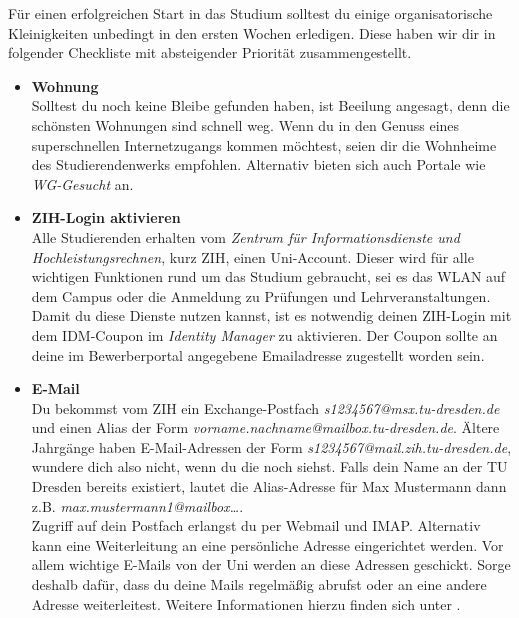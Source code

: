 \newcommand{\checkbox}[1]{\item[$\square$]\textbf{#1}\\}


Für einen erfolgreichen Start in das Studium solltest du einige organisatorische
Kleinigkeiten unbedingt in den ersten Wochen erledigen. Diese haben wir dir in
folgender Checkliste mit absteigender Priorität zusammengestellt.

\begin{itemize}[leftmargin=*]

\checkbox{Wohnung}
Solltest du noch keine Bleibe gefunden haben, ist Beeilung angesagt, denn die
schönsten Wohnungen sind schnell weg. Wenn du in den Genuss eines
superschnellen Internetzugangs kommen möchtest, seien dir die Wohnheime
 des
Studierendenwerks empfohlen. Alternativ bieten sich auch Portale wie
\textit{WG-Gesucht}  an.

\checkbox{ZIH-Login aktivieren}
Alle Studierenden erhalten vom \textit{Zentrum für Informationsdienste und
Hochleistungsrechnen}, kurz ZIH, einen Uni-Account. Dieser wird für alle
wichtigen Funktionen rund um das Studium gebraucht, sei es das WLAN auf dem
Campus oder die Anmeldung zu Prüfungen und Lehrveranstaltungen. \\
Damit du diese Dienste nutzen kannst, ist es notwendig deinen ZIH-Login mit dem
IDM-Coupon im \textit{Identity Manager} 
zu aktivieren. Der Coupon sollte an deine im Bewerberportal angegebene
Emailadresse zugestellt worden sein.

\checkbox{E-Mail}
Du bekommst vom ZIH ein Exchange-Postfach \textit{s1234567@msx.tu-dresden.de}
und einen Alias der Form \textit{vorname.nachname@mailbox.tu-dresden.de}.
Ältere Jahrgänge haben E-Mail-Adressen der Form
\textit{s1234567\allowbreak{}@mail.zih.tu-dresden.de}, wundere dich also nicht,
wenn du die noch siehst. Falls dein Name an der TU Dresden bereits existiert,
lautet die Alias-Adresse für Max Mustermann dann z.B.
\textit{max.mustermann1@mailbox…}. \\
Zugriff auf dein Postfach erlangst du per Webmail und IMAP. Alternativ kann eine
Weiterleitung an eine persönliche Adresse eingerichtet werden. Vor allem
wichtige E-Mails von der Uni werden an diese Adressen geschickt. Sorge deshalb
dafür, dass du deine Mails regelmäßig abrufst oder an eine andere Adresse
weiterleitest. Weitere Informationen hierzu finden sich unter
.


\end{itemize}
